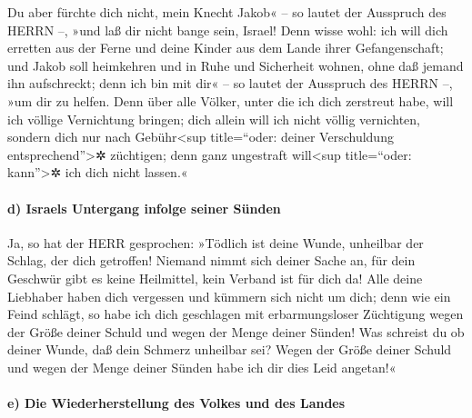 Du aber fürchte dich nicht, mein Knecht Jakob« -- so
lautet der Ausspruch des HERRN --, »und laß dir nicht bange sein,
Israel! Denn wisse wohl: ich will dich erretten aus der Ferne und deine
Kinder aus dem Lande ihrer Gefangenschaft; und Jakob soll heimkehren und
in Ruhe und Sicherheit wohnen, ohne daß jemand ihn aufschreckt;
denn ich bin mit dir« -- so lautet der Ausspruch des
HERRN --, »um dir zu helfen. Denn über alle Völker, unter die ich dich
zerstreut habe, will ich völlige Vernichtung bringen; dich allein will
ich nicht völlig vernichten, sondern dich nur nach Gebühr\textless sup
title=``oder: deiner Verschuldung entsprechend''\textgreater✲ züchtigen;
denn ganz ungestraft will\textless sup title=``oder: kann''\textgreater✲
ich dich nicht lassen.«

\hypertarget{d-israels-untergang-infolge-seiner-suxfcnden}{%
\paragraph{d) Israels Untergang infolge seiner
Sünden}\label{d-israels-untergang-infolge-seiner-suxfcnden}}

Ja, so hat der HERR gesprochen: »Tödlich ist deine Wunde,
unheilbar der Schlag, der dich getroffen! Niemand nimmt
sich deiner Sache an, für dein Geschwür gibt es keine Heilmittel, kein
Verband ist für dich da! Alle deine Liebhaber haben dich
vergessen und kümmern sich nicht um dich; denn wie ein Feind schlägt, so
habe ich dich geschlagen mit erbarmungsloser Züchtigung wegen der Größe
deiner Schuld und wegen der Menge deiner Sünden! Was
schreist du ob deiner Wunde, daß dein Schmerz unheilbar sei? Wegen der
Größe deiner Schuld und wegen der Menge deiner Sünden habe ich dir dies
Leid angetan!«

\hypertarget{e-die-wiederherstellung-des-volkes-und-des-landes}{%
\paragraph{e) Die Wiederherstellung des Volkes und des
Landes}\label{e-die-wiederherstellung-des-volkes-und-des-landes}}

